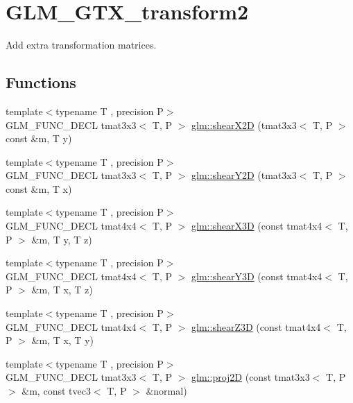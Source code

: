 \hypertarget{group__gtx__transform2}{\section{G\-L\-M\-\_\-\-G\-T\-X\-\_\-transform2}
\label{group__gtx__transform2}
}


Add extra transformation matrices.  


\subsection*{Functions}
\begin{DoxyCompactItemize}
\item 
{\footnotesize template$<$typename T , precision P$>$ }\\G\-L\-M\-\_\-\-F\-U\-N\-C\-\_\-\-D\-E\-C\-L tmat3x3$<$ T, P $>$ \hyperlink{group__gtx__transform2_ga10f6c62d8f827c4cacedb71fd05e4ba2}{glm\-::shear\-X2\-D} (tmat3x3$<$ T, P $>$ const \&m, T y)
\item 
{\footnotesize template$<$typename T , precision P$>$ }\\G\-L\-M\-\_\-\-F\-U\-N\-C\-\_\-\-D\-E\-C\-L tmat3x3$<$ T, P $>$ \hyperlink{group__gtx__transform2_ga21ade82859e09a5cdaf4a01fbf8dc61b}{glm\-::shear\-Y2\-D} (tmat3x3$<$ T, P $>$ const \&m, T x)
\item 
{\footnotesize template$<$typename T , precision P$>$ }\\G\-L\-M\-\_\-\-F\-U\-N\-C\-\_\-\-D\-E\-C\-L tmat4x4$<$ T, P $>$ \hyperlink{group__gtx__transform2_gae06ce274e4754f925d5d68440e89452e}{glm\-::shear\-X3\-D} (const tmat4x4$<$ T, P $>$ \&m, T y, T z)
\item 
{\footnotesize template$<$typename T , precision P$>$ }\\G\-L\-M\-\_\-\-F\-U\-N\-C\-\_\-\-D\-E\-C\-L tmat4x4$<$ T, P $>$ \hyperlink{group__gtx__transform2_ga31253ea18fdcdfde08c134c8b67688f7}{glm\-::shear\-Y3\-D} (const tmat4x4$<$ T, P $>$ \&m, T x, T z)
\item 
{\footnotesize template$<$typename T , precision P$>$ }\\G\-L\-M\-\_\-\-F\-U\-N\-C\-\_\-\-D\-E\-C\-L tmat4x4$<$ T, P $>$ \hyperlink{group__gtx__transform2_ga5558ac64a7144685bf2eb4483a0e2f51}{glm\-::shear\-Z3\-D} (const tmat4x4$<$ T, P $>$ \&m, T x, T y)
\item 
{\footnotesize template$<$typename T , precision P$>$ }\\G\-L\-M\-\_\-\-F\-U\-N\-C\-\_\-\-D\-E\-C\-L tmat3x3$<$ T, P $>$ \hyperlink{group__gtx__transform2_gacfce1085167a8bfb71a55ea14d22752f}{glm\-::proj2\-D} (const tmat3x3$<$ T, P $>$ \&m, const tvec3$<$ T, P $>$ \&normal)

\end{DoxyCompactItemize}
